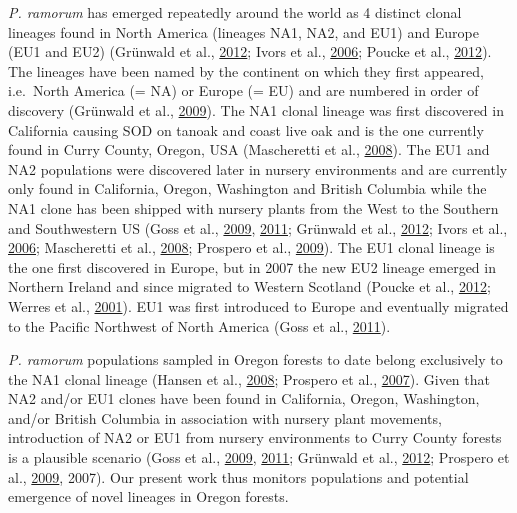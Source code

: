 \documentclass[double,12pt]{beavtex}
\begin{document}
  \emph{P. ramorum} has emerged repeatedly around the world as 4 distinct
  clonal lineages found in North America (lineages NA1, NA2, and EU1) and
  Europe (EU1 and EU2) (Grünwald et al.,
  \protect\hyperlink{ref-grunwald2012emergence}{2012}; Ivors et al.,
  \protect\hyperlink{ref-ivors2006microsatellite}{2006}; Poucke et al.,
  \protect\hyperlink{ref-vanpoucke2012discovery}{2012}). The lineages have
  been named by the continent on which they first appeared, i.e.~North
  America (= NA) or Europe (= EU) and are numbered in order of discovery
  (Grünwald et al.,
  \protect\hyperlink{ref-grunwald2009standardizing}{2009}). The NA1 clonal
  lineage was first discovered in California causing SOD on tanoak and
  coast live oak and is the one currently found in Curry County, Oregon,
  USA (Mascheretti et al.,
  \protect\hyperlink{ref-mascheretti2008reconstruction}{2008}). The EU1
  and NA2 populations were discovered later in nursery environments and
  are currently only found in California, Oregon, Washington and British
  Columbia while the NA1 clone has been shipped with nursery plants from
  the West to the Southern and Southwestern US (Goss et al.,
  \protect\hyperlink{ref-goss2009population}{2009},
  \protect\hyperlink{ref-goss2011phytophthora}{2011}; Grünwald et al.,
  \protect\hyperlink{ref-grunwald2012emergence}{2012}; Ivors et al.,
  \protect\hyperlink{ref-ivors2006microsatellite}{2006}; Mascheretti et
  al., \protect\hyperlink{ref-mascheretti2008reconstruction}{2008};
  Prospero et al., \protect\hyperlink{ref-prospero2009migration}{2009}).
  The EU1 clonal lineage is the one first discovered in Europe, but in
  2007 the new EU2 lineage emerged in Northern Ireland and since migrated
  to Western Scotland (Poucke et al.,
  \protect\hyperlink{ref-vanpoucke2012discovery}{2012}; Werres et al.,
  \protect\hyperlink{ref-werres2001phytophthora}{2001}). EU1 was first
  introduced to Europe and eventually migrated to the Pacific Northwest of
  North America (Goss et al.,
  \protect\hyperlink{ref-goss2011phytophthora}{2011}).
  
  \emph{P. ramorum} populations sampled in Oregon forests to date belong
  exclusively to the NA1 clonal lineage (Hansen et al.,
  \protect\hyperlink{ref-hansen2008epidemiology}{2008}; Prospero et al.,
  \protect\hyperlink{ref-prospero2007population}{2007}). Given that NA2
  and/or EU1 clones have been found in California, Oregon, Washington,
  and/or British Columbia in association with nursery plant movements,
  introduction of NA2 or EU1 from nursery environments to Curry County
  forests is a plausible scenario (Goss et al.,
  \protect\hyperlink{ref-goss2009population}{2009},
  \protect\hyperlink{ref-goss2011phytophthora}{2011}; Grünwald et al.,
  \protect\hyperlink{ref-grunwald2012emergence}{2012}; Prospero et al.,
  \protect\hyperlink{ref-prospero2009migration}{2009}, 2007). Our present
  work thus monitors populations and potential emergence of novel lineages
  in Oregon forests.
  
\end{document}
